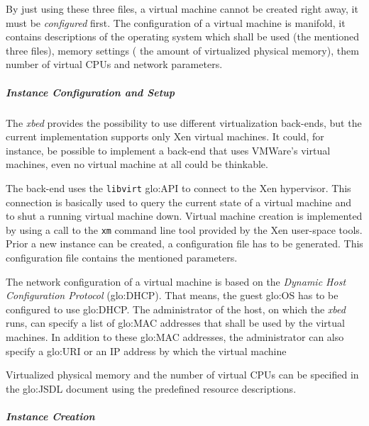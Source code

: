 By just using these three files, a virtual machine cannot be created right
away, it must be \emph{configured}  first.  The configuration of a virtual
machine  is manifold,  it contains  descriptions of  the  operating system
which shall be used (\ie  the mentioned three files), memory settings (\ie
the amount  of virtualized physical  memory), them number of  virtual CPUs
and network parameters.

\subparagraph{Instance Configuration and Setup}

The \emph{xbed}  provides the possibility to  use different virtualization
back-ends,  but  the  current  implementation supports  only  Xen  virtual
machines. It could, for instance, be possible to implement a back-end that
uses VMWare's  \cite{vmware} virtual machines, even no  virtual machine at
all could be thinkable.

The back-end uses  the \texttt{libvirt} \gls{glo:API} to connect
to  the Xen hypervisor.  This connection  is basically  used to  query the
current state of  a virtual machine and to shut  a running virtual machine
down.   Virtual machine creation  is implemented  by using  a call  to the
\texttt{xm} command line tool provided by the Xen user-space tools.  Prior
a  new  instance   can  be  created,  a  configuration   file  has  to  be
generated. This configuration file contains the mentioned parameters.

The  network  configuration   of  a  virtual  machine  is   based  on  the
\emph{Dynamic Host Configuration  Protocol} (\gls{glo:DHCP}).  That means,
the guest  \gls{glo:OS} has  to be configured  to use  \gls{glo:DHCP}. The
administrator of  the host, on which  the \emph{xbed} runs,  can specify a
list  of  \gls{glo:MAC}  addresses  that  shall be  used  by  the  virtual
machines. In addition to  these \gls{glo:MAC} addresses, the administrator
can also  specify a \gls{glo:URI}  or an IP  address by which  the virtual
machine

Virtualized  physical  memory  and  the  number of  virtual  CPUs  can  be
specified  in the  \gls{glo:JSDL} document  using the  predefined resource
descriptions.

\subparagraph{Instance Creation}

